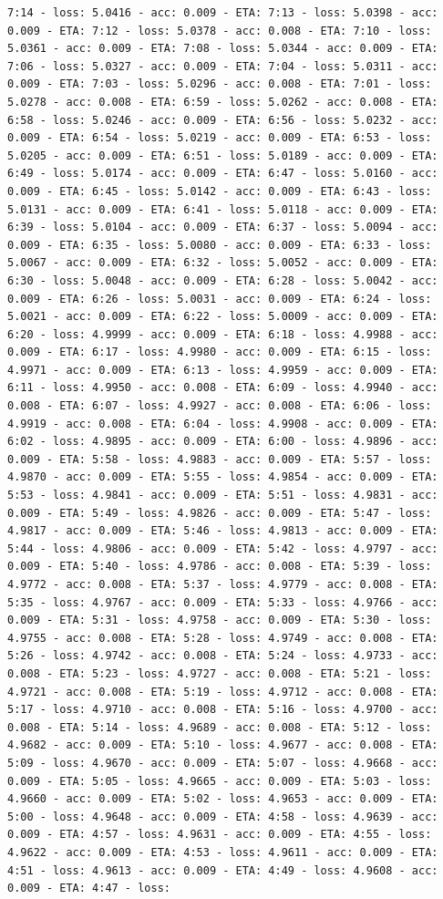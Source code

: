 \documentclass[11pt]{article}
\begin{document}
\begin{Verbatim}[commandchars=\\\{\}]
7:14 - loss: 5.0416 - acc: 0.009 - ETA: 7:13 - loss: 5.0398 - acc: 0.009 - ETA: 7:12 - loss: 5.0378 - acc: 0.008 - ETA: 7:10 - loss: 5.0361 - acc: 0.009 - ETA: 7:08 - loss: 5.0344 - acc: 0.009 - ETA: 7:06 - loss: 5.0327 - acc: 0.009 - ETA: 7:04 - loss: 5.0311 - acc: 0.009 - ETA: 7:03 - loss: 5.0296 - acc: 0.008 - ETA: 7:01 - loss: 5.0278 - acc: 0.008 - ETA: 6:59 - loss: 5.0262 - acc: 0.008 - ETA: 6:58 - loss: 5.0246 - acc: 0.009 - ETA: 6:56 - loss: 5.0232 - acc: 0.009 - ETA: 6:54 - loss: 5.0219 - acc: 0.009 - ETA: 6:53 - loss: 5.0205 - acc: 0.009 - ETA: 6:51 - loss: 5.0189 - acc: 0.009 - ETA: 6:49 - loss: 5.0174 - acc: 0.009 - ETA: 6:47 - loss: 5.0160 - acc: 0.009 - ETA: 6:45 - loss: 5.0142 - acc: 0.009 - ETA: 6:43 - loss: 5.0131 - acc: 0.009 - ETA: 6:41 - loss: 5.0118 - acc: 0.009 - ETA: 6:39 - loss: 5.0104 - acc: 0.009 - ETA: 6:37 - loss: 5.0094 - acc: 0.009 - ETA: 6:35 - loss: 5.0080 - acc: 0.009 - ETA: 6:33 - loss: 5.0067 - acc: 0.009 - ETA: 6:32 - loss: 5.0052 - acc: 0.009 - ETA: 6:30 - loss: 5.0048 - acc: 0.009 - ETA: 6:28 - loss: 5.0042 - acc: 0.009 - ETA: 6:26 - loss: 5.0031 - acc: 0.009 - ETA: 6:24 - loss: 5.0021 - acc: 0.009 - ETA: 6:22 - loss: 5.0009 - acc: 0.009 - ETA: 6:20 - loss: 4.9999 - acc: 0.009 - ETA: 6:18 - loss: 4.9988 - acc: 0.009 - ETA: 6:17 - loss: 4.9980 - acc: 0.009 - ETA: 6:15 - loss: 4.9971 - acc: 0.009 - ETA: 6:13 - loss: 4.9959 - acc: 0.009 - ETA: 6:11 - loss: 4.9950 - acc: 0.008 - ETA: 6:09 - loss: 4.9940 - acc: 0.008 - ETA: 6:07 - loss: 4.9927 - acc: 0.008 - ETA: 6:06 - loss: 4.9919 - acc: 0.008 - ETA: 6:04 - loss: 4.9908 - acc: 0.009 - ETA: 6:02 - loss: 4.9895 - acc: 0.009 - ETA: 6:00 - loss: 4.9896 - acc: 0.009 - ETA: 5:58 - loss: 4.9883 - acc: 0.009 - ETA: 5:57 - loss: 4.9870 - acc: 0.009 - ETA: 5:55 - loss: 4.9854 - acc: 0.009 - ETA: 5:53 - loss: 4.9841 - acc: 0.009 - ETA: 5:51 - loss: 4.9831 - acc: 0.009 - ETA: 5:49 - loss: 4.9826 - acc: 0.009 - ETA: 5:47 - loss: 4.9817 - acc: 0.009 - ETA: 5:46 - loss: 4.9813 - acc: 0.009 - ETA: 5:44 - loss: 4.9806 - acc: 0.009 - ETA: 5:42 - loss: 4.9797 - acc: 0.009 - ETA: 5:40 - loss: 4.9786 - acc: 0.008 - ETA: 5:39 - loss: 4.9772 - acc: 0.008 - ETA: 5:37 - loss: 4.9779 - acc: 0.008 - ETA: 5:35 - loss: 4.9767 - acc: 0.009 - ETA: 5:33 - loss: 4.9766 - acc: 0.009 - ETA: 5:31 - loss: 4.9758 - acc: 0.009 - ETA: 5:30 - loss: 4.9755 - acc: 0.008 - ETA: 5:28 - loss: 4.9749 - acc: 0.008 - ETA: 5:26 - loss: 4.9742 - acc: 0.008 - ETA: 5:24 - loss: 4.9733 - acc: 0.008 - ETA: 5:23 - loss: 4.9727 - acc: 0.008 - ETA: 5:21 - loss: 4.9721 - acc: 0.008 - ETA: 5:19 - loss: 4.9712 - acc: 0.008 - ETA: 5:17 - loss: 4.9710 - acc: 0.008 - ETA: 5:16 - loss: 4.9700 - acc: 0.008 - ETA: 5:14 - loss: 4.9689 - acc: 0.008 - ETA: 5:12 - loss: 4.9682 - acc: 0.009 - ETA: 5:10 - loss: 4.9677 - acc: 0.008 - ETA: 5:09 - loss: 4.9670 - acc: 0.009 - ETA: 5:07 - loss: 4.9668 - acc: 0.009 - ETA: 5:05 - loss: 4.9665 - acc: 0.009 - ETA: 5:03 - loss: 4.9660 - acc: 0.009 - ETA: 5:02 - loss: 4.9653 - acc: 0.009 - ETA: 5:00 - loss: 4.9648 - acc: 0.009 - ETA: 4:58 - loss: 4.9639 - acc: 0.009 - ETA: 4:57 - loss: 4.9631 - acc: 0.009 - ETA: 4:55 - loss: 4.9622 - acc: 0.009 - ETA: 4:53 - loss: 4.9611 - acc: 0.009 - ETA: 4:51 - loss: 4.9613 - acc: 0.009 - ETA: 4:49 - loss: 4.9608 - acc: 0.009 - ETA: 4:47 - loss: 
\end{Verbatim}
\end{document}
